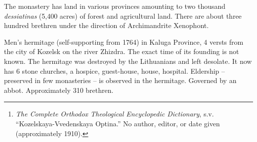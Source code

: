 The monastery has land in various provinces amounting to two thousand \textit{dessiatinas} (5,400 acres) of forest and agricultural land. There are about three hundred brethren under the direction of Archimandrite Xenophont.

\clearpage
\subtitle{
	Optina Hermitage\footnote{\textit{The Complete Orthodox Theological Encyclopedic Dictionary}, s.v. ``Kozelskaya-Vvedenskaya Optina.'' No author, editor, or date given (approximately 1910).}
}

Men's hermitage (self-supporting from 1764) in Kaluga Province, 4 versts from the city of Kozelsk on the river Zhizdra. The exact time of its founding is not known. The hermitage was destroyed by the Lithuanians and left desolate. It now has 6 stone churches, a hospice, guest-house, house, hospital. Eldership -- preserved in few monasteries -- is observed in the hermitage. Governed by an abbot. Approximately 310 brethren.
